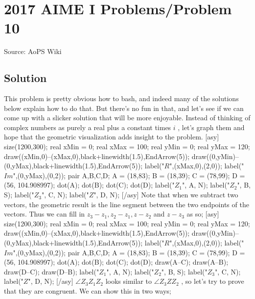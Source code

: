 \documentclass[12pt]{article}
\begin{document}
\section*{{2017 AIME I Problems/Problem 10}}
Source: AoPS Wiki

\subsection*{Solution}
This problem is pretty obvious how to bash, and indeed many of the solutions below explain how to do that. But there’s no fun in that, and let’s see if we can come up with a slicker solution that will be more enjoyable. Instead of thinking of complex numbers as purely a real plus a constant times $i$ , let’s graph them and hope that the geometric visualization adds insight to the problem. [asy] size(1200,300); real xMin = 0; real xMax = 100; real yMin = 0; real yMax = 120; draw((xMin,0)--(xMax,0),black+linewidth(1.5),EndArrow(5)); draw((0,yMin)--(0,yMax),black+linewidth(1.5),EndArrow(5)); label("$R$",(xMax,0),(2,0)); label("$Im$",(0,yMax),(0,2)); pair A,B,C,D; A = (18,83); B = (18,39); C = (78,99); D = (56, 104.908997); dot(A); dot(B); dot(C); dot(D); label("$Z_1$", A, N); label("$Z_2$", B, S); label("$Z_3$", C, N); label("$Z$", D, N); [/asy] Note that when we subtract two vectors, the geometric result is the line segment between the two endpoints of the vectors. Thus we can fill in $z_3 - z_1, z_2 - z_1, z-z_2$ and $z-z_3$ as so; [asy] size(1200,300); real xMin = 0; real xMax = 100; real yMin = 0; real yMax = 120; draw((xMin,0)--(xMax,0),black+linewidth(1.5),EndArrow(5)); draw((0,yMin)--(0,yMax),black+linewidth(1.5),EndArrow(5)); label("$R$",(xMax,0),(2,0)); label("$Im$",(0,yMax),(0,2)); pair A,B,C,D; A = (18,83); B = (18,39); C = (78,99); D = (56, 104.908997); dot(A); dot(B); dot(C); dot(D); draw(A--C); draw(A--B); draw(D--C); draw(D--B); label("$Z_1$", A, N); label("$Z_2$", B, S); label("$Z_3$", C, N); label("$Z$", D, N); [/asy] $\angle Z_3Z_1Z_2$ looks similar to $\angle Z_3ZZ_2$ , so let’s try to prove that they are congruent. We can show this in two ways;
\end{document}
